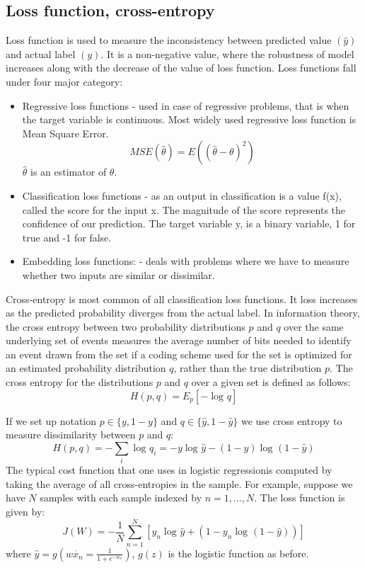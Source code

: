 \documentclass[conference]{IEEEtran}
\begin{document}
\subsection{Loss function, cross-entropy}
Loss function is used to measure the inconsistency between predicted value $\left(\widehat{y}\right)$ and actual label $\left(y\right)$. It is a non-negative value, where the robustness of model increases along with the decrease of the value of loss function. Loss functions fall under four major category:
\begin{itemize}
    \item Regressive loss functions - used in case of regressive problems, that is when the target variable is continuous. Most widely used regressive loss function is Mean Square Error.
    $$MSE\left(\widehat{\theta}\right)= E\left(\left(\widehat{\theta}-\theta\right)^2\right)$$
    $\widehat{\theta}$ is an estimator of $\theta$.
    \item Classification loss functions - as an output in classification is a value f(x), called the score for the input x. The magnitude of the score represents the confidence of our prediction. The target variable y, is a binary variable, 1 for true and -1 for false.
    \item Embedding loss functions: - deals with problems where we have to measure whether two inputs are similar or dissimilar.
\end{itemize}

Cross-entropy is most common of all classification loss functions. It loss increases as the predicted probability diverges from the actual label. In information theory, the cross entropy between two probability
distributions $p$ and $q$ over the same underlying set of
events measures the average number of bits needed to identify
an event drawn from the set if a coding scheme used for the set
is optimized for an estimated probability distribution $q$, rather
than the true distribution $p$.
The cross entropy for the distributions $p$ and $q$ over a given set is defined as follows:
$$H(p,q)=E_{p}\left[-\log_{} q\right]$$

If we set up notation $p \in \{y, 1 - y\}$ and $q \in \{\widehat{y}, 1 - \widehat{y}\}$ we use cross entropy to measure dissimilarity between $p$ and $q$:
$$H(p,q)=-\sum_{i}\log_{}q_{i}=-y\log_{}\widehat{y}-\left(1-y\right)\log_{}\left(1-\widehat{y}\right)$$
The typical cost function that one uses in logistic regressionis computed by taking the average of all cross-entropies in the sample. For example, suppose we have $N$ samples with each sample indexed by $n=1,...,N$. The loss function is given by:
$$J\left(W\right)=-\frac{1}{N}\sum_{n=1}^{N}\left[y_{n}\log_{}\widehat{y}+\left(1-y_{n}\log_{}\left(1-\widehat{y}\right)\right)\right]$$
where $\widehat{y}=g\left(w\dot{x_{n}}=\frac{1}{1+e^{-w_{n}}}\right)$, $g(z)$ is the logistic function as before.
\end{document}
